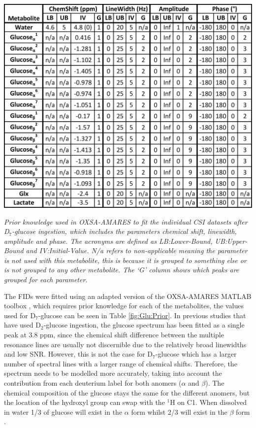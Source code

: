 \begin{table}[H]
    \centering
    \includegraphics[width = 1\textwidth]{Figures/Glucose/Prior_Table.png}
    \caption{\textit{Prior knowledge used in OXSA-AMARES \cite{Vanhamme1997ImprovedKnowledge, Purvis2017OXSA:MATLAB} to fit the individual \ac{CSI} datasets after D$_7$-glucose ingestion, which includes the parameters chemical shift, linewidth, amplitude and phase. The acronyms are defined as LB:Lower-Bound, UB:Upper-Bound and IV:Initial-Value. N/a refers to non-applicable meaning the parameter is not used with this metabolite, this is because it is grouped to something else or is not grouped to any other metabolite. The `G' column shows which peaks are grouped for each parameter.}}
    \label{fig:Glu:Prior}
\end{table}

The \ac{FID}s were fitted using an adapted version of the OXSA-AMARES MATLAB toolbox \cite{Vanhamme1997ImprovedKnowledge, Purvis2017OXSA:MATLAB}, which requires prior knowledge for each of the metabolites, the values used for D$_7$-glucose can be seen in Table \ref{fig:Glu:Prior}. In previous studies that have used D$_2$-glucose ingestion, the glucose spectrum has been fitted as a single peak at 3.8 ppm, since the chemical shift difference between the multiple resonance lines are usually not discernible due to the relatively broad linewidths and low SNR. However, this is not the case for D$_7$-glucose \cite{Govindaraju2000ProtonMetabolites} which has a larger number of spectral lines with a larger range of chemical shifts. Therefore, the spectrum needs to be modelled more accurately, taking into account the contribution from each deuterium label for both anomers ($\alpha$ and $\beta$). The chemical composition of the glucose stays the same for the different anomers, but the location of the hydroxyl group can swap with the $^1$H on C1. When dissolved in water 1/3 of glucose will exist in the $\alpha$ form whilst 2/3 will exist in the $\beta$ form \cite{Leitch2009-Erythrocytes}.

